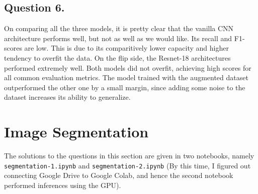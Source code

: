 \documentclass[10pt]{article}
\begin{document}
    \subsection*{\textbf{Question 6.}}
    On comparing all the three models, it is pretty clear that the vanilla CNN architecture
    performs well, but not as well as we would like. Its recall and F1-scores are low. This
    is due to its comparitively lower capacity and higher tendency to overfit the data. On the
    flip side, the Resnet-18 architectures performed extremely well. Both models did not
    overfit, achieving high scores for all common evaluation metrics. The model trained with
    the augmented dataset outperformed the other one by a small margin, since adding some noise
    to the dataset increases its ability to generalize.

    \section*{\textbf{Image Segmentation}}
    The solutions to the questions in this section are given in two notebooks,
    namely \texttt{segmentation-1.ipynb} and \texttt{segmentation-2.ipynb} (By this
    time, I figured out connecting Google Drive to Google Colab, and hence the second
    notebook performed inferences using the GPU).
\end{document}
